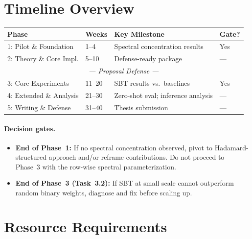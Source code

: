 \documentclass[12pt,a4paper]{article}
\begin{document}
\section{Timeline Overview}\label{sec:timeline}

\begin{center}
\begin{tabular}{llll}
\toprule
\textbf{Phase} & \textbf{Weeks} & \textbf{Key Milestone} & \textbf{Gate?} \\
\midrule
\rowcolor{phase1}
1: Pilot \& Foundation & 1--4 & Spectral concentration results & Yes \\
\rowcolor{phase2}
2: Theory \& Core Impl. & 5--10 & Defense-ready package & --- \\
\midrule
\multicolumn{4}{c}{\textit{--- Proposal Defense ---}} \\
\midrule
\rowcolor{phase3}
3: Core Experiments & 11--20 & SBT results vs.\ baselines & Yes \\
\rowcolor{phase4}
4: Extended \& Analysis & 21--30 & Zero-shot eval; inference analysis & --- \\
\rowcolor{phase5}
5: Writing \& Defense & 31--40 & Thesis submission & --- \\
\bottomrule
\end{tabular}
\end{center}

\paragraph{Decision gates.}
\begin{itemize}
    \item \textbf{End of Phase~1:} If no spectral concentration observed, pivot to Hadamard-structured approach and/or reframe contributions. Do not proceed to Phase~3 with the row-wise spectral parameterization.
    \item \textbf{End of Phase~3 (Task~3.2):} If SBT at small scale cannot outperform random binary weights, diagnose and fix before scaling up.
\end{itemize}


\section{Resource Requirements}\label{sec:resources}
\end{document}
